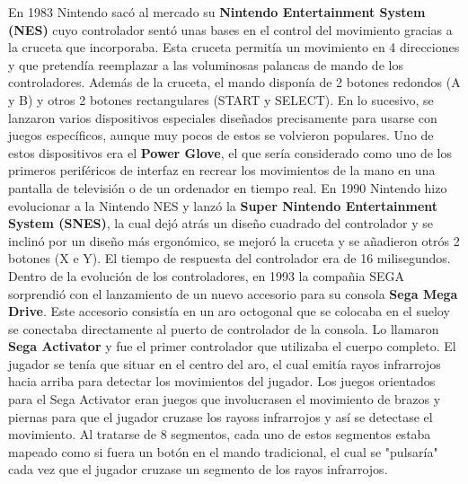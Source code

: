 En 1983 Nintendo sac\'o al mercado su \textbf{Nintendo Entertainment System (NES)} cuyo controlador sent\'o unas bases en el control del movimiento gracias a la cruceta que incorporaba. Esta cruceta permit\'ia un movimiento en 4 direcciones y que pretend\'ia reemplazar a las voluminosas palancas de mando de los controladores. Adem\'as de la cruceta, el mando dispon\'ia de 2 botones redondos (A y B) y otros 2 botones rectangulares (START y SELECT). En lo sucesivo, se lanzaron varios dispositivos especiales dise\~nados precisamente para usarse con juegos espec\'ificos, aunque muy pocos de estos se volvieron populares. Uno de estos dispositivos era el \textbf{Power Glove}, el que ser\'ia considerado como uno de los primeros perif\'ericos de interfaz en recrear los movimientos de la mano en una pantalla de televisi\'on o de un ordenador en tiempo real. En 1990 Nintendo hizo evolucionar a la Nintendo NES y lanz\'o la \textbf{Super Nintendo Entertainment System (SNES)}, la cual dej\'o atr\'as un dise\~no cuadrado del controlador y se inclin\'o por un dise\~no m\'as ergon\'omico, se mejor\'o la cruceta y se a\~nadieron otr\'os 2 botones (X e Y). El tiempo de respuesta del controlador era de 16 milisegundos. Dentro de la evoluci\'on de los controladores, en 1993 la compa\~nia SEGA sorprendi\'o con el lanzamiento de un nuevo accesorio para su consola \textbf{Sega Mega Drive}. Este accesorio consist\'ia en un aro octogonal que se colocaba en el sueloy se conectaba directamente al puerto de controlador de la consola. Lo llamaron \textbf{Sega Activator} y fue el primer controlador que utilizaba el cuerpo completo. El jugador se ten\'ia que situar en el centro del aro, el cual emit\'ia rayos infrarrojos hacia arriba para detectar los movimientos del jugador. Los juegos orientados para el Sega Activator eran juegos que involucrasen el movimiento de brazos y piernas para que el jugador cruzase los rayoss infrarrojos y as\'i se detectase el movimiento. Al tratarse de 8 segmentos, cada uno de estos segmentos estaba mapeado como si fuera un bot\'on en el mando tradicional, el cual se "pulsar\'ia" cada vez que el jugador cruzase un segmento de los rayos infrarrojos. \par

